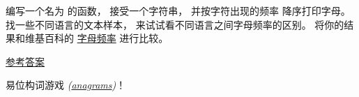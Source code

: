 {\begin{exercise}

编写一个名为 {\em  {}} 的函数，
接受一个字符串， 并按字符出现的频率 降序打印字母。
找一些不同语言的文本样本， 来试试看不同语言之间字母频率的区别。
将你的结果和维基百科的
\href{http://en.wikipedia.org/wiki/Letter_frequencies}{字母频率} 进行比较。

\href{http://thinkpython2.com/code/most_frequent.py}{参考答案}

 
 



\end{exercise}


\begin{exercise}
\label{anagrams}
  

易位构词游戏 {\em (\href{https://zh.wikipedia.org/wiki/%E6%98%93%E4%BD%8D%E6%9E%84%E8%AF%8D%E6%B8%B8%E6%88%8F}{anagrams})}！

\begin{enumerate}





\end{enumerate}
\end{exercise}}
